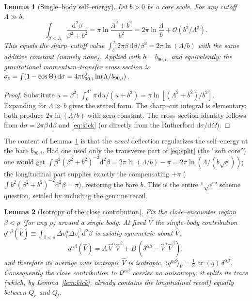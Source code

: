 \documentclass[11pt]{article}
\DeclareMathOperator{\Tr}{tr}
\newcommand{\dd}{\mathrm{d}}
\newcommand{\Vh}{\hat V}
\newcommand{\Q}{\mathcal Q}
\newcommand{\order}[1]{\mathcal O\!\left(#1\right)}
\newtheorem{lemma}{Lemma}
\begin{document}
\begin{lemma}[Single--body self--energy]
\label{lem:self}
Let $b>0$ be a core scale. For any cutoff $\Lambda\gg b$,
\begin{equation}
  \int_{\beta<\Lambda}\frac{\dd^2\beta}{\beta^2+b^2}
  =\pi\ln\frac{\Lambda^2+b^2}{b^2}
  =2\pi\ln\frac{\Lambda}{b}+\order{b^2/\Lambda^2}.
  \label{eq:self}
\end{equation}
This equals the sharp--cutoff value $\int_{b}^{\Lambda}2\pi\beta\,\dd\beta/\beta^2=2\pi\ln(\Lambda/b)$
with the \emph{same} additive constant (namely none). Applied with $b=b_{90,i}$, and equivalently:
the gravitational momentum--transfer cross section is
$\sigma_{\rm t}=\int(1-\cos\Theta)\,\dd\sigma=4\pi b_{90,i}^2\ln(\Lambda/b_{90,i})$.
\end{lemma}

\begin{proof}
Substitute $u=\beta^2$: $\int_0^{\Lambda^2}\pi\,\dd u/(u+b^2)=\pi\ln[(\Lambda^2+b^2)/b^2]$.
Expanding for $\Lambda\gg b$ gives the stated form. The sharp--cut integral is elementary; both
produce $2\pi\ln(\Lambda/b)$ with zero constant. The cross--section identity follows from
$\dd\sigma=2\pi\beta\,\dd\beta$ and \eqref{eq:kick} (or directly from the Rutherford
$\dd\sigma/\dd\Omega$).
\end{proof}

The content of Lemma~\ref{lem:self} is that the \emph{exact} deflection regularizes the self--energy
at the bare $b_{90,i}$. Had one used only the transverse part of \eqref{eq:split} (the ``soft
core'') one would get
$\int\beta^2(\beta^2+b^2)^{-2}\dd^2\beta=2\pi\ln(\Lambda/b)-\pi=2\pi\ln(\Lambda/(b\sqrt e))$;
the longitudinal part supplies exactly the compensating $+\pi$
($\int b^2(\beta^2+b^2)^{-2}\dd^2\beta=\pi$), restoring the bare $b$. This is the entire
``$\sqrt e$'' scheme question, settled by including the genuine recoil.

\begin{lemma}[Isotropy of the close contribution]
\label{lem:iso}
Fix the close--encounter region $\beta<\rho$ (for any $\rho$) around a \emph{single} body. At fixed
$\vec V$ the single--body contribution
$q^{\alpha\beta}(\Vh)\equiv\int_{\beta<\rho}\Delta v_i^\alpha\Delta v_i^\beta\,\dd^2\beta$ is
axially symmetric about $\Vh$,
\begin{equation}
  q^{\alpha\beta}(\Vh)=A\,\Vh^\alpha\Vh^\beta+B\,(\delta^{\alpha\beta}-\Vh^\alpha\Vh^\beta),
\end{equation}
and therefore its average over isotropic $\Vh$ is isotropic,
$\langle q^{\alpha\beta}\rangle_{\Vh}=\tfrac13\,\Tr(q)\,\delta^{\alpha\beta}$. Consequently the close
contribution to $\Q^{\alpha\beta}$ carries \emph{no anisotropy}: it splits its trace (which, by
Lemma~\ref{lem:kick}, already contains the longitudinal recoil) equally between $Q_r$ and $Q_t$.
\end{lemma}
\end{document}
